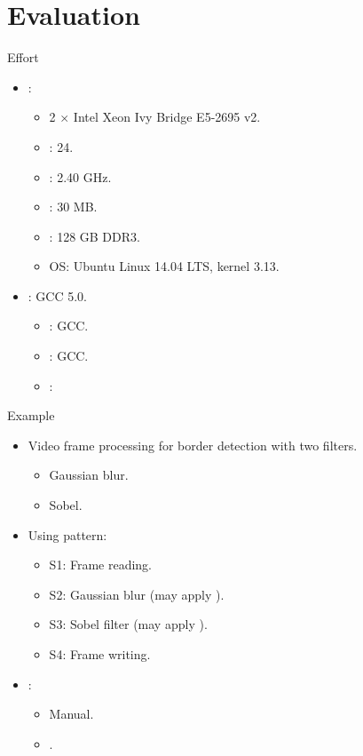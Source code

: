 \section{Evaluation}

\begin{frame}[t]{Effort}
\begin{itemize}
  \item {}:
    \begin{itemize}
      \item 2 $\times$ Intel Xeon Ivy Bridge E5-2695 v2.
      \item {}: 24.
      \item {}: 2.40 GHz.
      \item {}: 30 MB.
      \item {}: 128 GB DDR3.
      \item OS: Ubuntu Linux 14.04 LTS, kernel 3.13.
    \end{itemize}

  \vfill
  \item {}: GCC 5.0.
    \begin{itemize}
      \item {}: GCC.
      \item {}: GCC.
      \item {}: 
    \end{itemize}
\end{itemize}
\end{frame}

\begin{frame}[t]{Example}
\begin{itemize}
  \item Video frame processing for border detection with two filters.
    \begin{itemize}
      \item Gaussian blur.
      \item Sobel.
    \end{itemize}
  \vfill\pause
  \item Using  pattern:
    \begin{itemize}
      \item S1: Frame reading.
      \item S2: Gaussian blur (may apply ).
      \item S3: Sobel filter (may apply ).
      \item S4: Frame writing.
    \end{itemize}
  \vfill\pause
  \item {}:
    \begin{itemize}
      \item Manual.
      \item {}.
    \end{itemize}
\end{itemize}
\end{frame}

